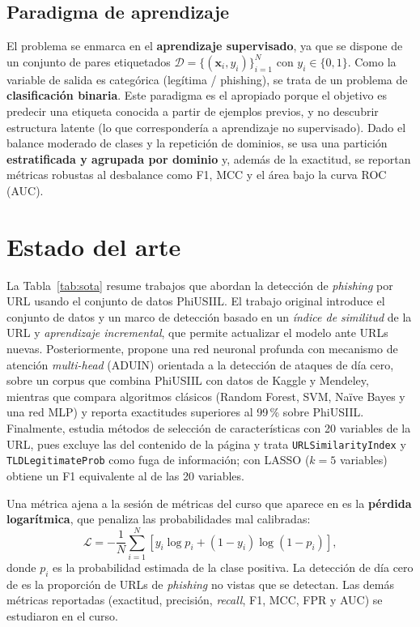 \documentclass[journal]{IEEEtran}
\begin{document}
\subsection{Paradigma de aprendizaje}
El problema se enmarca en el \textbf{aprendizaje supervisado}, ya que se dispone de un conjunto
de pares etiquetados $\mathcal{D}=\{(\mathbf{x}_i,y_i)\}_{i=1}^{N}$ con $y_i\in\{0,1\}$. Como la
variable de salida es categórica (legítima / phishing), se trata de un problema de
\textbf{clasificación binaria}. Este paradigma es el apropiado porque el objetivo es predecir
una etiqueta conocida a partir de ejemplos previos, y no descubrir estructura latente (lo que
correspondería a aprendizaje no supervisado). Dado el balance moderado de clases y la repetición
de dominios, se usa una partición \textbf{estratificada y agrupada por dominio} y, además de la exactitud, se
reportan métricas robustas al desbalance como F1, MCC y el área bajo la curva ROC (AUC).

\section{Estado del arte}
\label{sec:estado}
La Tabla~\ref{tab:sota} resume trabajos que abordan la detección de \textit{phishing} por URL
usando el conjunto de datos PhiUSIIL. El trabajo original \cite{prasad2024} introduce el
conjunto de datos y un marco de detección basado en un \emph{índice de similitud} de la URL y
\emph{aprendizaje incremental}, que permite actualizar el modelo ante URLs nuevas.
Posteriormente, \cite{gobinath2026} propone una red neuronal profunda con mecanismo de atención
\textit{multi-head} (ADUIN) orientada a la detección de ataques de día cero, sobre un corpus que
combina PhiUSIIL con datos de Kaggle y Mendeley, mientras que \cite{bao2026} compara algoritmos
clásicos (Random Forest, SVM, Naïve Bayes y una red MLP) y reporta exactitudes superiores al
99\,\% sobre PhiUSIIL. Finalmente, \cite{yulianti2026} estudia métodos de selección de
características con 20 variables de la URL, pues excluye las del contenido de la página y trata
\texttt{URLSimilarityIndex} y \texttt{TLDLegitimateProb} como fuga de información; con LASSO
($k=5$ variables) obtiene un F1 equivalente al de las 20 variables.

Una métrica ajena a la sesión de métricas del curso que aparece en \cite{bao2026} es la
\textbf{pérdida logarítmica}, que penaliza las probabilidades mal calibradas:
\begin{equation}
\mathcal{L} = -\frac{1}{N}\sum_{i=1}^{N}\left[y_i\log p_i + (1-y_i)\log(1-p_i)\right],
\end{equation}
donde $p_i$ es la probabilidad estimada de la clase positiva. La detección de día cero de
\cite{gobinath2026} es la proporción de URLs de \textit{phishing} no vistas que se detectan. Las
demás métricas reportadas (exactitud, precisión, \textit{recall}, F1, MCC, FPR y AUC) se estudiaron
en el curso.
\end{document}
